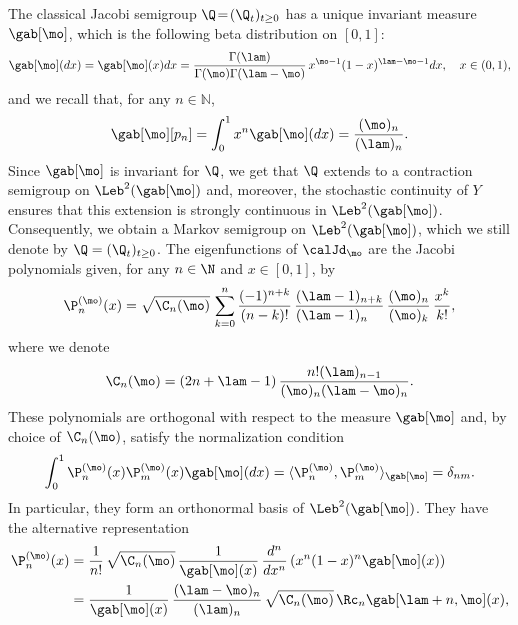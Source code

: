 \begin{appendix}
The classical Jacobi semigroup $\Q\!=\!(\Q_t)_{t \geq 0}$ has a unique invariant measure~$\gab[\mo]$, which is the
following beta distribution on $[0,1]$:\vspace*{-3pt}
\begin{equation}
\label{eq:def_beta}
\gab[\mo](dx) = \gab[\mo](x)dx =\frac{\Gamma(\lam)}{\Gamma(\mo)\Gamma(\lam-\mo)}\,x^{\mo-1}(1-x)^{\lam-\mo- 1}dx, \quad x \in (0,1),
\end{equation}
and we recall that, for any $n\in \mathbb{N}$,\vspace*{-3pt}
\begin{equation}
\label{eq:beta-moments}
\gab[\mo][p_n] = \int_0^1 x^n\gab[\mo](dx)= \frac{(\mo)_n}{(\lam)_n}.
\end{equation}
Since $\gab[\mo]$ is invariant for $\Q$, we get that $\Q$ extends to a contraction semigroup on $\Leb^2(\gab[\mo])$ and, moreover, the stochastic continuity of $Y$ ensures that this extension is strongly continuous in $\Leb^2(\gab[\mo])$. Consequently, we obtain a Markov semigroup on $\Leb^2(\gab[\mo])$, which we still denote by $\Q = (\Q_t)_{t \geq 0}$. The eigenfunctions of $\calJd_\mo$ are the Jacobi polynomials given, for any $n \in \N$ and $x \in [0,1]$, by
\begin{equation}
\label{J_pol}
\P_n^{(\mo)} (x) = \sqrt{\C_n(\mo)}\, \sum_{k=0}^n \frac{(-1)^{n+k}}{(n-k)!}\, \frac{(\lam-1)_{n+k}}{(\lam-1)_{n\phantom{+k}}}\, \frac{(\mo)_n}{(\mo)_k}\, \frac{x^k}{k!},
\end{equation}
where we denote
\begin{equation}
\label{eq:Cn-lam-mo}
\C_n(\mo)=(2n+\lam-1)\,\frac{n!(\lam)_{n-1}}{(\mo)_n(\lam-\mo)_n}.
\end{equation}
These polynomials are orthogonal with respect to the measure $\gab[\mo]$ and, by choice of $\C_n(\mo)$, satisfy the normalization condition
\begin{equation*}
\int_0^1 \P_n^{(\mo)}(x) \P_m^{(\mo)}(x) \gab[\mo](dx) = \langle \P_n^{(\mo)}, \P_m^{(\mo)}\rangle_{\gab[\mo]} = \delta_{nm}.
\end{equation*}
In particular, they form an orthonormal basis of $\Leb^2(\gab[\mo])$. They have the alternative representation
\begin{align}
\P_n^{(\mo)}(x) &= \frac{1}{n!}\, \sqrt{\C_n(\mo)}\, \frac{1}{\gab[\mo](x)}\, \frac{d^n}{dx^n}\left(x^n(1-x)^n \gab[\mo](x)\right) \nonumber \\
\label{eq:Jac-Rod}
&= \frac{1}{\gab[\mo](x)}\, \frac{(\lam-\mo)_n}{(\lam)_n}\, \sqrt{\C_n(\mo)}\, \Rc_{n} \gab[\lam+n,\mo](x),

\end{align}
\end{appendix}
